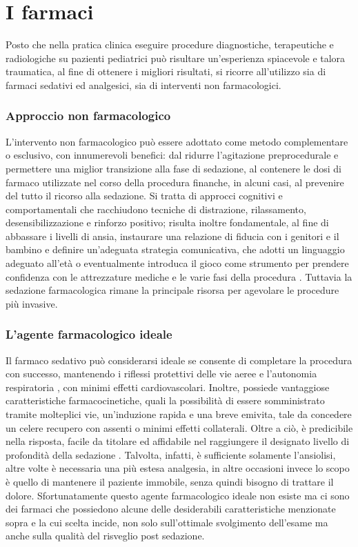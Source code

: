 \chapter{I farmaci}

Posto che nella pratica clinica eseguire procedure diagnostiche, terapeutiche e radiologiche su pazienti pediatrici può risultare un'esperienza spiacevole e talora traumatica, al fine di ottenere i migliori risultati, si ricorre all'utilizzo sia di farmaci sedativi ed analgesici, sia di interventi non farmacologici. 

\subsection*{Approccio non farmacologico}

L'intervento non farmacologico può essere adottato come metodo complementare o esclusivo, con innumerevoli benefici: dal ridurre l'agitazione preprocedurale e permettere una miglior transizione alla fase di sedazione, al contenere le dosi di farmaco utilizzate nel corso della procedura finanche, in alcuni casi, al prevenire del tutto il ricorso alla sedazione. Si tratta di approcci cognitivi e comportamentali che racchiudono tecniche di distrazione, rilassamento, desensibilizzazione e rinforzo positivo; risulta inoltre fondamentale, al fine di abbassare i livelli di ansia, instaurare una relazione di fiducia con i genitori e il bambino e definire un'adeguata strategia comunicativa, che adotti un linguaggio adeguato all'età o eventualmente introduca il gioco come strumento per prendere confidenza con le attrezzature mediche e le varie fasi della procedura \cite{Uptodate}. Tuttavia la sedazione farmacologica rimane la principale risorsa per agevolare le procedure più invasive. 

\subsection*{L'agente farmacologico ideale}

Il farmaco sedativo può considerarsi ideale se consente di completare la procedura con successo, mantenendo i riflessi protettivi delle vie aeree e l'autonomia respiratoria \cite{Krauss2006}, con minimi effetti cardiovascolari. Inoltre, possiede vantaggiose caratteristiche farmacocinetiche, quali la possibilità di essere somministrato tramite  molteplici vie, un'induzione rapida e una breve emivita, tale da concedere un celere recupero con assenti o minimi effetti collaterali. Oltre a ciò, è predicibile nella risposta, facile da titolare ed affidabile nel raggiungere il designato livello di profondità della sedazione \cite{Mahmoud2015}. Talvolta, infatti, è sufficiente solamente l'ansiolisi, altre volte è necessaria una più estesa analgesia, in altre occasioni invece lo scopo è quello di mantenere il paziente immobile, senza quindi bisogno di trattare il dolore. 
Sfortunatamente questo agente farmacologico ideale non esiste ma ci sono dei farmaci che possiedono alcune delle desiderabili caratteristiche menzionate sopra e la cui scelta incide, non solo sull'ottimale svolgimento dell'esame ma anche sulla qualità del risveglio post sedazione. 

